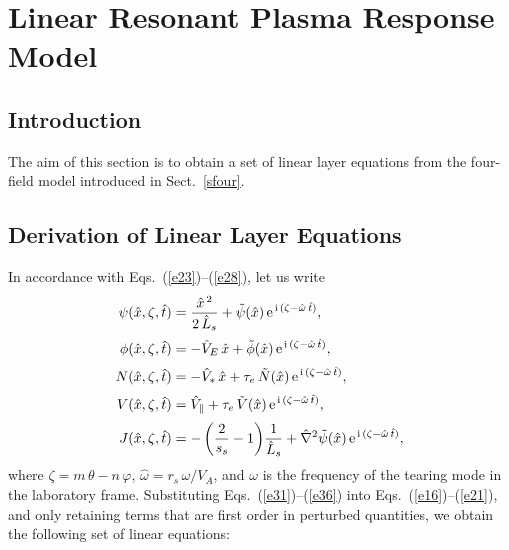 \documentclass[12pt,prb,aps]{revtex4-1}
\begin{document}
\section{Linear Resonant Plasma Response Model}\label{layer}
\subsection{Introduction}
The aim of this section is to obtain a set of linear layer equations from the four-field model
introduced in Sect.~\ref{sfour}.

\subsection{Derivation of Linear Layer Equations}
In accordance with Eqs.~(\ref{e23})--(\ref{e28}), let us write
\begin{align}\label{e31}
\psi(\hat{x},\zeta,\hat{t}) &= \frac{\hat{x}^{\,2} }{2\,\hat{L}_s}+ \tilde{\psi}(\hat{x})\,{\rm e}^{\,{\rm i}\,(\zeta-\hat{\omega}\,\hat{t})},\\[0.5ex]
\phi(\hat{x},\zeta,\hat{t}) &=-\hat{V}_E\,\hat{x}+ \tilde{\phi}(\hat{x})\,{\rm e}^{\,{\rm i}\,(\zeta-\hat{\omega}\,\hat{t})},\\[0.5ex]
N(\hat{x},\zeta,\hat{t}) &= -\hat{V}_\ast\,\hat{x}+\tau_e\,\tilde{N}(\hat{x})\,{\rm e}^{\,{\rm i}\,(\zeta-\hat{\omega}\,\hat{t})},\\[0.5ex]
V(\hat{x},\zeta,\hat{t}) &= \hat{V}_\parallel +\tau_e\,\tilde{V}(\hat{x})\,{\rm e}^{\,{\rm i}\,(\zeta-\hat{\omega}\,\hat{t})},\\[0.5ex]
J(\hat{x},\zeta,\hat{t}) &=-\left(\frac{2}{s_s}-1\right)\!\frac{1}{\hat{L}_s}+ \hat{\nabla}^2\tilde{\psi}(\hat{x})\,{\rm e}^{\,{\rm i}\,(\zeta-\hat{\omega}\,\hat{t})},\label{e36}
\end{align}
where $\zeta=m\,\theta-n\,\varphi$, $\hat{\omega}=r_s\,\omega/V_A$, and $\omega$ is the frequency of the tearing mode in the laboratory frame. 
Substituting Eqs.~(\ref{e31})--(\ref{e36}) into Eqs.~(\ref{e16})--(\ref{e21}), 
 and only retaining terms that
are first order in perturbed quantities, we obtain the following set of linear equations:
\end{document}
